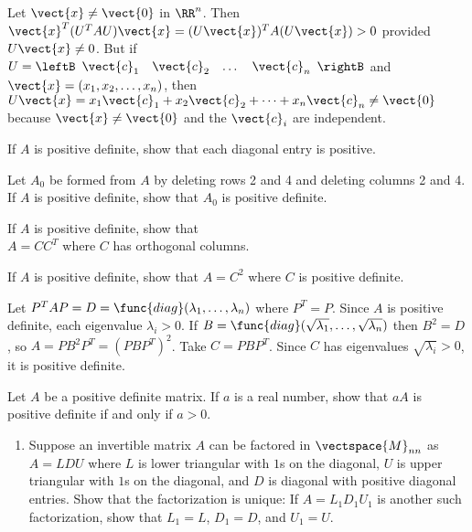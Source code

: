 \begin{multicols}{2}
\begin{ex}
\begin{sol}
Let $\vect{x} \neq \vect{0}$ in $\RR^n$. Then $\vect{x}^{T}(U^{T}AU)\vect{x} = (U\vect{x})^{T}A(U\vect{x}) > 0$ provided $U\vect{x} \neq 0$. But if $U = \leftB \begin{array}{cccc}
\vect{c}_{1} & \vect{c}_{2} & \dots &  \vect{c}_{n}
\end{array}\rightB$ and $\vect{x} = (x_{1}, x_{2}, \dots, x_{n})$, then $U\vect{x} = x_{1}\vect{c}_{1} + x_{2}\vect{c}_{2} + \dots  + x_{n}\vect{c}_{n} \neq \vect{0}$ because $\vect{x} \neq \vect{0}$ and the $\vect{c}_{i}$ are independent.
\end{sol}
\end{ex}

\begin{ex}
If $A$ is positive definite, show that each diagonal entry is positive.
\end{ex}

\begin{ex}
Let $A_{0}$ be formed from $A$ by deleting rows 2 and 4 and deleting columns 2 and 4. If $A$ is positive definite, show that $A_{0}$ is positive definite.
\end{ex}

\begin{ex}
If $A$ is positive definite, show that \\ $A = CC^{T}$ where $C$ has orthogonal columns.
\end{ex}

\begin{ex}
If $A$ is positive definite, show that $A = C^{2}$ where $C$ is positive definite.

\begin{sol}
Let $P^{T}AP = D = \func{diag}(\lambda_{1}, \dots, \lambda_{n})$ where $P^{T} = P$. Since $A$ is positive definite, each eigenvalue $\lambda_{i} > 0$. If $B = \func{diag}(\sqrt{\lambda_{1}}, \dots, \sqrt{\lambda_{n}})$ then $B^{2} = D$, so $A = PB^{2}P^{T} = (PBP^{T})^{2}$. Take $C = PBP^{T}$. Since $C$ has eigenvalues $\sqrt{\lambda_{i}} > 0$, it is positive definite.
\end{sol}
\end{ex}

\begin{ex}
Let $A$ be a positive definite matrix. If $a$ is a real number, show that $aA$ is positive definite if and only if $a > 0$.
\end{ex}

\begin{ex}
\begin{enumerate}[label={\alph*.}]
\item Suppose an invertible matrix $A$ can be factored in $\vectspace{M}_{nn}$ as $A = LDU$ where $L$ is lower triangular with $1$s on the diagonal, $U$ is upper triangular with $1$s on the diagonal, and $D$ is diagonal with positive diagonal entries. Show that the factorization is unique: If $A = L_{1}D_{1}U_{1}$ is another such factorization, show that $L_{1} = L$, $D_{1} = D$, and $U_{1} = U$.


\end{enumerate}
\end{ex}
\end{multicols}
